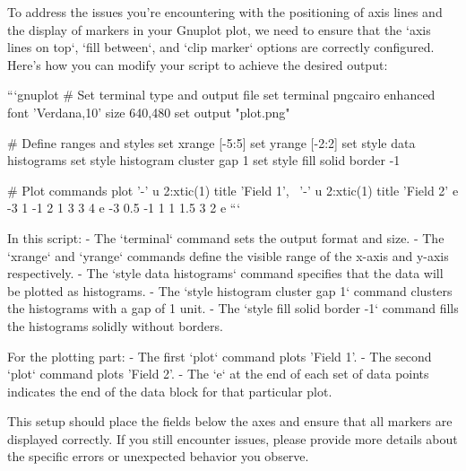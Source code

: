 To address the issues you're encountering with the positioning of axis lines and the display of markers in your Gnuplot plot, we need to ensure that the `axis lines on top`, `fill between`, and `clip marker` options are correctly configured. Here's how you can modify your script to achieve the desired output:

```gnuplot
# Set terminal type and output file
set terminal pngcairo enhanced font 'Verdana,10' size 640,480
set output "plot.png"

# Define ranges and styles
set xrange [-5:5]
set yrange [-2:2]
set style data histograms
set style histogram cluster gap 1
set style fill solid border -1

# Plot commands
plot '-' u 2:xtic(1) title 'Field 1', \
     '-' u 2:xtic(1) title 'Field 2'
e
-3 1
-1 2
1 3
3 4
e
-3 0.5
-1 1
1 1.5
3 2
e
```

In this script:
- The `terminal` command sets the output format and size.
- The `xrange` and `yrange` commands define the visible range of the x-axis and y-axis respectively.
- The `style data histograms` command specifies that the data will be plotted as histograms.
- The `style histogram cluster gap 1` command clusters the histograms with a gap of 1 unit.
- The `style fill solid border -1` command fills the histograms solidly without borders.

For the plotting part:
- The first `plot` command plots 'Field 1'.
- The second `plot` command plots 'Field 2'.
- The `e` at the end of each set of data points indicates the end of the data block for that particular plot.

This setup should place the fields below the axes and ensure that all markers are displayed correctly. If you still encounter issues, please provide more details about the specific errors or unexpected behavior you observe.